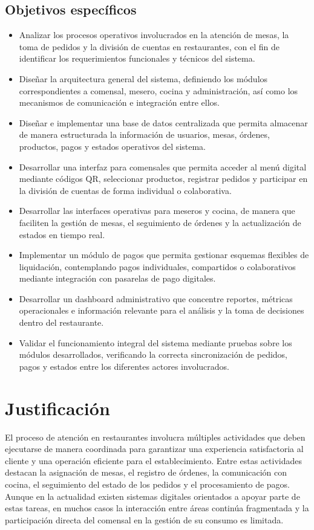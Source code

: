 \documentclass[12pt]{report}
\begin{document}
\subsection{Objetivos específicos}
\begin{itemize}[leftmargin=*, itemsep=0.35em]
  \item Analizar los procesos operativos involucrados en la atención de mesas, la toma de pedidos y la división de cuentas en restaurantes, con el fin de identificar los requerimientos funcionales y técnicos del sistema.
  \item Diseñar la arquitectura general del sistema, definiendo los módulos correspondientes a comensal, mesero, cocina y administración, así como los mecanismos de comunicación e integración entre ellos.
  \item Diseñar e implementar una base de datos centralizada que permita almacenar de manera estructurada la información de usuarios, mesas, órdenes, productos, pagos y estados operativos del sistema.
  \item Desarrollar una interfaz para comensales que permita acceder al menú digital mediante códigos QR, seleccionar productos, registrar pedidos y participar en la división de cuentas de forma individual o colaborativa.
  \item Desarrollar las interfaces operativas para meseros y cocina, de manera que faciliten la gestión de mesas, el seguimiento de órdenes y la actualización de estados en tiempo real.
  \item Implementar un módulo de pagos que permita gestionar esquemas flexibles de liquidación, contemplando pagos individuales, compartidos o colaborativos mediante integración con pasarelas de pago digitales.
  \item Desarrollar un dashboard administrativo que concentre reportes, métricas operacionales e información relevante para el análisis y la toma de decisiones dentro del restaurante.
  \item Validar el funcionamiento integral del sistema mediante pruebas sobre los módulos desarrollados, verificando la correcta sincronización de pedidos, pagos y estados entre los diferentes actores involucrados.
\end{itemize}

\section{Justificación}
El proceso de atención en restaurantes involucra múltiples actividades que deben ejecutarse de manera coordinada para garantizar una experiencia satisfactoria al cliente y una operación eficiente para el establecimiento. Entre estas actividades destacan la asignación de mesas, el registro de órdenes, la comunicación con cocina, el seguimiento del estado de los pedidos y el procesamiento de pagos. Aunque en la actualidad existen sistemas digitales orientados a apoyar parte de estas tareas, en muchos casos la interacción entre áreas continúa fragmentada y la participación directa del comensal en la gestión de su consumo es limitada.
\end{document}
